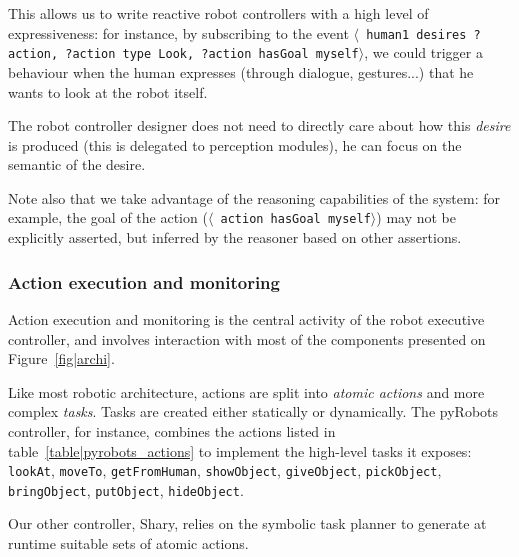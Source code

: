 \documentclass[preprint,3p,times]{elsarticle}
\newcommand{\stmt}[1]{{\footnotesize \tt $\langle$ #1\relax$\rangle$}}
\begin{document}
This allows us to write reactive robot controllers with a high level of
expressiveness: for instance, by subscribing to the event \stmt{human1 desires
?action, ?action type Look, ?action hasGoal myself}, we could trigger a
behaviour when the human expresses (through dialogue, gestures...) that he
wants to look at the robot itself.

The robot controller designer does not need to directly care about how this
\emph{desire} is produced (this is delegated to perception modules), he can
focus on the semantic of the desire.

Note also that we take advantage of the reasoning capabilities of the system:
for example, the goal of the action (\stmt{action hasGoal myself}) may not be
explicitly asserted, but inferred by the reasoner based on other assertions.

\subsubsection{Action execution and monitoring}\label{sec:action}

Action execution and monitoring is the central activity of the robot executive
controller, and involves interaction with most of the components presented on
Figure~\ref{fig|archi}.

Like most robotic architecture, actions are split into \emph{atomic actions}
and more complex \emph{tasks}. Tasks are created either statically or dynamically.
The {\sc pyRobots} controller, for instance, combines the actions listed in
table~\ref{table|pyrobots_actions} to implement the high-level tasks it exposes: {\tt
lookAt}, {\tt moveTo}, {\tt getFromHuman}, {\tt showObject}, {\tt giveObject},
{\tt pickObject}, {\tt bringObject}, {\tt putObject}, {\tt hideObject}.

Our other controller, {\sc Shary}, relies on the symbolic task planner to
generate at runtime suitable sets of atomic actions.
\end{document}
